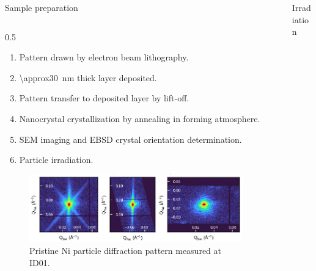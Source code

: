 \documentclass[final]{beamer}
\newlength{\sepwidth}
\newlength{\colwidth}
\newcommand{\separatorcolumn}{\begin{column}{\sepwidth}\end{column}}
\begin{document}
\begin{frame}[t]
\begin{columns}[t]
\begin{column}{\colwidth}
\begin{block}{Sample preparation}
\begin{columns}[T]
            \begin{column}{0.5\colwidth}
                \begin{enumerate}
                    \item Pattern drawn by electron beam lithography.
                    \item \qty{\approx30}{\nm} thick layer deposited.
                    \item Pattern transfer to deposited layer by lift-off.
                    \item Nanocrystal crystallization by annealing in forming atmosphere.
                    \item SEM imaging and EBSD crystal orientation determination.
                    \item Particle irradiation. 
                \end{enumerate}

                \begin{figure}
                    \centering
                    \includegraphics[width=0.425\colwidth]{Figures/S10_3D_data.pdf}
                    \caption{Pristine Ni particle diffraction pattern measured at ID01.}
                    \label{fig:EBSDMap}
                \end{figure}
                
            \end{column}

        \end{columns}
        
    \end{block}
    
\end{column}

\separatorcolumn

\begin{column}{\colwidth}

    \begin{block}{Irradiation}



\end{block}
\end{column}
\end{columns}
\end{frame}
\end{document}

